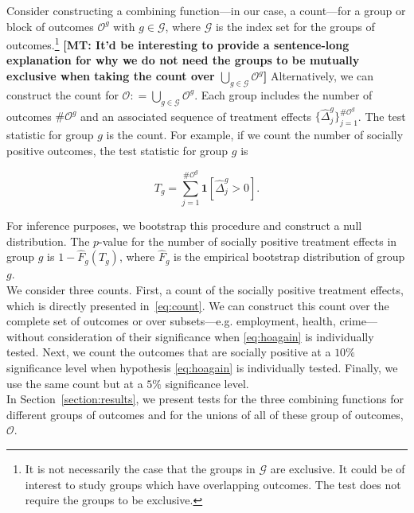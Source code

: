 \noindent Consider constructing a combining function---in our case, a count---for a group or block of outcomes $\mathcal{O}^g$ with $g \in \mathcal{G}$, where $\mathcal{G}$ is the index set for the groups of outcomes.\footnote{It is not necessarily the case that the groups in $\mathcal{G}$ are exclusive. It could be of interest to study groups which have overlapping outcomes. The test does not require the groups to be exclusive.} \textbf{[MT: It'd be interesting to provide a sentence-long explanation for why we do not need the groups to be mutually exclusive when taking the count over $ \bigcup \limits _{g \in \mathcal{G}} \mathcal{O}^g $]} Alternatively, we can construct the count for $\mathcal{O} : =  \bigcup \limits _{g \in \mathcal{G}} \mathcal{O}^g$. Each group includes the number of outcomes $\# \mathcal{O}^g$ and an associated sequence of treatment effects $\{ \widehat{\Delta}_{j}^{g} \}_{j = 1}^{\# \mathcal{O}^g}$. The test statistic for group $g$ is the count. For example, if we count the number of socially positive outcomes, the test statistic for group $g$ is 

\begin{equation}
T_{g} = \sum _{j=1}^{\# \mathcal{O}^g} \mathbf{1} \left[ \widehat{\Delta}_{j}^{g} > 0\right]. \label{eq:count}
\end{equation} 

\noindent For inference purposes, we bootstrap this procedure and construct a null distribution. The $p$-value for the number of socially positive treatment effects in group $g$ is $1 - \widehat{F}_{g} \left( T_{g} \right)$, where $ \widehat{F}_{g}$ is the empirical bootstrap distribution of group $g$. \\

\noindent We consider three counts. First, a count of the socially positive treatment effects, which is directly presented in~\eqref{eq:count}. We can construct this count over the complete set of outcomes or over subsets---e.g. employment, health, crime---without consideration of their significance when \eqref{eq:hoagain} is individually tested. Next, we count the outcomes that are  socially positive at a $10\%$ significance level when hypothesis \eqref{eq:hoagain} is individually tested. Finally, we use the same count but at a $5\%$ significance level.\\

\noindent In Section~\ref{section:results}, we present tests for the three combining functions for different groups of outcomes and for the unions of all of these group of outcomes, $\mathcal{O}$.

